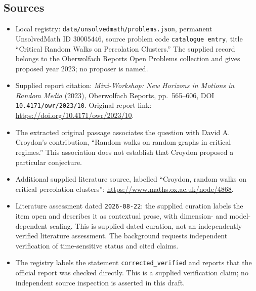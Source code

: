 \documentclass[11pt]{article}
\begin{document}
\subsection{Sources}
\begin{itemize}
\item Local registry: \texttt{data/unsolvedmath/problems.json}, permanent UnsolvedMath ID \(30005446\), source problem code \texttt{catalogue entry}, title ``Critical Random Walks on Percolation Clusters.'' The supplied record belongs to the Oberwolfach Reports Open Problems collection and gives proposed year \(2023\); no proposer is named.
\item Supplied report citation: \emph{Mini-Workshop: New Horizons in Motions in Random Media} (2023), Oberwolfach Reports, pp.\ 565--606, DOI \texttt{10.4171/owr/2023/10}. Original report link: \url{https://doi.org/10.4171/owr/2023/10}.
\item The extracted original passage associates the question with David A. Croydon's contribution, ``Random walks on random graphs in critical regimes.'' This association does not establish that Croydon proposed a particular conjecture.
\item Additional supplied literature source, labelled ``Croydon, random walks on critical percolation clusters'': \url{https://www.maths.ox.ac.uk/node/4868}.
\item Literature assessment dated \texttt{2026-08-22}: the supplied curation labels the item open and describes it as contextual prose, with dimension- and model-dependent scaling. This is supplied dated curation, not an independently verified literature assessment. The background requests independent verification of time-sensitive status and cited claims.
\item The registry labels the statement \texttt{corrected\_verified} and reports that the official report was checked directly. This is a supplied verification claim; no independent source inspection is asserted in this draft.
\end{itemize}
\end{document}
